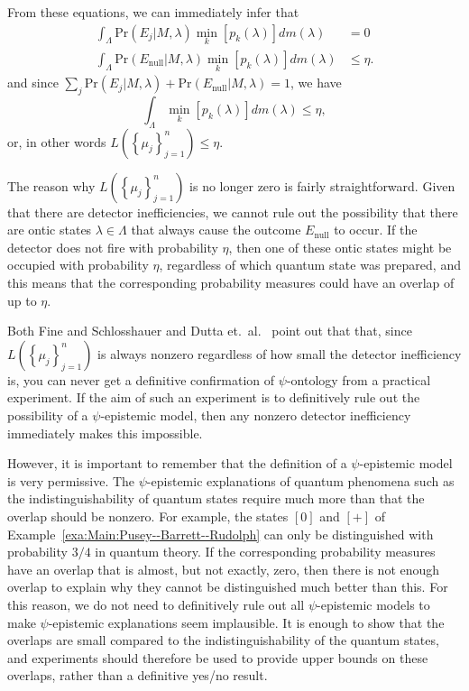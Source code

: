 \documentclass[DIV=calc,paper=a4,fontsize=11pt,twocolumn]{scrartcl} %
\theoremstyle{definition}
\theoremstyle{plain}
\newcommand{\Proj}[1]{\ensuremath{\left [ #1 \right ]}}
\begin{document}
From these equations, we can immediately infer that
\begin{align}
\int_{\Lambda} \text{Pr}(E_j|M,\lambda) \min_k \left [ p_k(\lambda)
\right ] dm(\lambda) & = 0 \\
\int_{\Lambda} \text{Pr}(E_{\text{null}}|M,\lambda) \min_k \left [
p_k(\lambda) \right ] dm(\lambda) & \leq \eta.
\end{align}
and since $\sum_j \text{Pr}(E_j|M,\lambda) +
\text{Pr}(E_{\text{null}}|M,\lambda) = 1$, we have
\begin{equation}
\int_{\Lambda} \min_k \left [ p_k(\lambda) \right ] dm(\lambda) \leq
\eta,
\end{equation}
or, in other words $L \left ( \left \{ \mu_j \right \}_{j=1}^n \right
) \leq \eta$.

The reason why $L \left ( \left \{ \mu_j \right \}_{j=1}^n \right )$
is no longer zero is fairly straightforward.  Given that there are
detector inefficiencies, we cannot rule out the possibility that there
are ontic states $\lambda \in \Lambda$ that always cause the outcome
$E_{\text{null}}$ to occur.  If the detector does not fire with
probability $\eta$, then one of these ontic states might be occupied
with probability $\eta$, regardless of which quantum state was
prepared, and this means that the corresponding probability measures
could have an overlap of up to $\eta$.

Both Fine and Schlosshauer \cite{Schlosshauer2012} and Dutta et.\ al.\
\cite{Dutta2014} point out that that, since $L \left ( \left \{ \mu_j
\right \}_{j=1}^n \right )$ is always nonzero regardless of how
small the detector inefficiency is, you can never get a definitive
confirmation of $\psi$-ontology from a practical experiment.  If the
aim of such an experiment is to definitively rule out the possibility
of a $\psi$-epistemic model, then any nonzero detector inefficiency
immediately makes this impossible.

However, it is important to remember that the definition of a
$\psi$-epistemic model is very permissive.  The $\psi$-epistemic
explanations of quantum phenomena such as the indistinguishability of
quantum states require much more than that the overlap should be
nonzero.  For example, the states $\Proj{0}$ and $\Proj{+}$ of
Example~\ref{exa:Main:Pusey--Barrett--Rudolph} can only be distinguished with probability
$3/4$ in quantum theory.  If the corresponding probability measures
have an overlap that is almost, but not exactly, zero, then there is
not enough overlap to explain why they cannot be distinguished much
better than this.  For this reason, we do not need to definitively
rule out all $\psi$-epistemic models to make $\psi$-epistemic
explanations seem implausible.  It is enough to show that the overlaps
are small compared to the indistinguishability of the quantum states,
and experiments should therefore be used to provide upper bounds on
these overlaps, rather than a definitive yes/no result.
\end{document}
